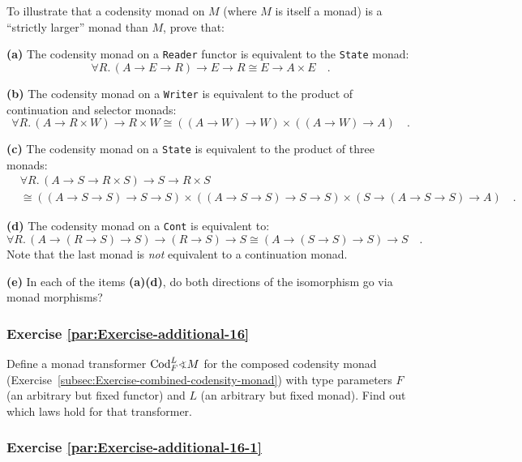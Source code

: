To illustrate that a codensity monad on $M$ (where $M$ is itself
a monad) is a \textsf{``}strictly larger\textsf{''} monad than $M$, prove that:

\textbf{(a)} The codensity monad on a \lstinline!Reader! functor
is equivalent to the \lstinline!State! monad:
\[
\forall R.\,(A\rightarrow E\rightarrow R)\rightarrow E\rightarrow R\cong E\rightarrow A\times E\quad.
\]

\textbf{(b)} The codensity monad on a \lstinline!Writer! is equivalent
to the product of continuation and selector monads:
\[
\forall R.\,(A\rightarrow R\times W)\rightarrow R\times W\cong((A\rightarrow W)\rightarrow W)\times((A\rightarrow W)\rightarrow A)\quad.
\]

\textbf{(c)} The codensity monad on a \lstinline!State! is equivalent
to the product of three monads:
\begin{align*}
 & \forall R.\,(A\rightarrow S\rightarrow R\times S)\rightarrow S\rightarrow R\times S\\
 & \cong((A\rightarrow S\rightarrow S)\rightarrow S\rightarrow S)\times((A\rightarrow S\rightarrow S)\rightarrow S\rightarrow S)\times(S\rightarrow(A\rightarrow S\rightarrow S)\rightarrow A)\quad.
\end{align*}

\textbf{(d)} The codensity monad on a \lstinline!Cont! is equivalent
to:
\[
\forall R.\,(A\rightarrow(R\rightarrow S)\rightarrow S)\rightarrow(R\rightarrow S)\rightarrow S\cong(A\rightarrow(S\rightarrow S)\rightarrow S)\rightarrow S\quad.
\]
Note that the last monad is \emph{not} equivalent to a continuation
monad.

\textbf{(e)} In each of the items \textbf{(a)}\textendash \textbf{(d)},
do both directions of the isomorphism go via monad morphisms?

\subsubsection{Exercise \label{par:Exercise-additional-16}\ref{par:Exercise-additional-16}}

Define a monad transformer $\text{Cod}_{F}^{L}\varangle M$ for the
composed codensity monad (Exercise~\ref{subsec:Exercise-combined-codensity-monad})
with type parameters $F$ (an arbitrary but fixed functor) and $L$
(an arbitrary but fixed monad). Find out which laws hold for that
transformer.

\subsubsection{Exercise \label{par:Exercise-additional-16-1}\ref{par:Exercise-additional-16-1}}

